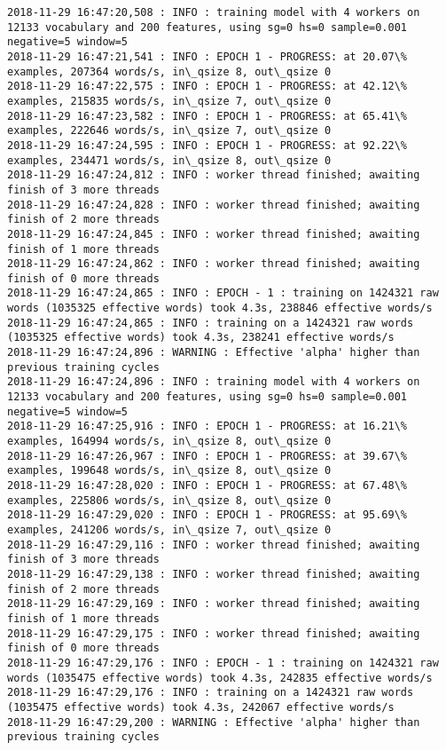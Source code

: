\documentclass[11pt]{article}
\begin{document}
\begin{Verbatim}[commandchars=\\\{\}]
2018-11-29 16:47:20,508 : INFO : training model with 4 workers on 12133 vocabulary and 200 features, using sg=0 hs=0 sample=0.001 negative=5 window=5
2018-11-29 16:47:21,541 : INFO : EPOCH 1 - PROGRESS: at 20.07\% examples, 207364 words/s, in\_qsize 8, out\_qsize 0
2018-11-29 16:47:22,575 : INFO : EPOCH 1 - PROGRESS: at 42.12\% examples, 215835 words/s, in\_qsize 7, out\_qsize 0
2018-11-29 16:47:23,582 : INFO : EPOCH 1 - PROGRESS: at 65.41\% examples, 222646 words/s, in\_qsize 7, out\_qsize 0
2018-11-29 16:47:24,595 : INFO : EPOCH 1 - PROGRESS: at 92.22\% examples, 234471 words/s, in\_qsize 8, out\_qsize 0
2018-11-29 16:47:24,812 : INFO : worker thread finished; awaiting finish of 3 more threads
2018-11-29 16:47:24,828 : INFO : worker thread finished; awaiting finish of 2 more threads
2018-11-29 16:47:24,845 : INFO : worker thread finished; awaiting finish of 1 more threads
2018-11-29 16:47:24,862 : INFO : worker thread finished; awaiting finish of 0 more threads
2018-11-29 16:47:24,865 : INFO : EPOCH - 1 : training on 1424321 raw words (1035325 effective words) took 4.3s, 238846 effective words/s
2018-11-29 16:47:24,865 : INFO : training on a 1424321 raw words (1035325 effective words) took 4.3s, 238241 effective words/s
2018-11-29 16:47:24,896 : WARNING : Effective 'alpha' higher than previous training cycles
2018-11-29 16:47:24,896 : INFO : training model with 4 workers on 12133 vocabulary and 200 features, using sg=0 hs=0 sample=0.001 negative=5 window=5
2018-11-29 16:47:25,916 : INFO : EPOCH 1 - PROGRESS: at 16.21\% examples, 164994 words/s, in\_qsize 8, out\_qsize 0
2018-11-29 16:47:26,967 : INFO : EPOCH 1 - PROGRESS: at 39.67\% examples, 199648 words/s, in\_qsize 8, out\_qsize 0
2018-11-29 16:47:28,020 : INFO : EPOCH 1 - PROGRESS: at 67.48\% examples, 225806 words/s, in\_qsize 8, out\_qsize 0
2018-11-29 16:47:29,020 : INFO : EPOCH 1 - PROGRESS: at 95.69\% examples, 241206 words/s, in\_qsize 7, out\_qsize 0
2018-11-29 16:47:29,116 : INFO : worker thread finished; awaiting finish of 3 more threads
2018-11-29 16:47:29,138 : INFO : worker thread finished; awaiting finish of 2 more threads
2018-11-29 16:47:29,169 : INFO : worker thread finished; awaiting finish of 1 more threads
2018-11-29 16:47:29,175 : INFO : worker thread finished; awaiting finish of 0 more threads
2018-11-29 16:47:29,176 : INFO : EPOCH - 1 : training on 1424321 raw words (1035475 effective words) took 4.3s, 242835 effective words/s
2018-11-29 16:47:29,176 : INFO : training on a 1424321 raw words (1035475 effective words) took 4.3s, 242067 effective words/s
2018-11-29 16:47:29,200 : WARNING : Effective 'alpha' higher than previous training cycles

\end{Verbatim}
\end{document}
